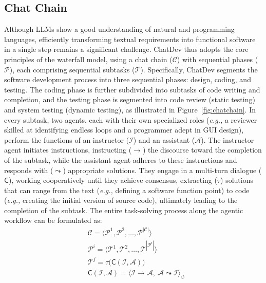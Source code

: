 \documentclass[11pt]{article}
\newcommand{\eg}{\textit{e.g., }}
\begin{document}
\subsection{Chat Chain}
Although LLMs show a good understanding of natural and programming languages, efficiently transforming textual requirements into functional software in a single step remains a significant challenge.
ChatDev thus adopts the core principles of the waterfall model, using a chat chain ($\mathcal{C}$) with sequential phases ($\mathcal{P}$), each comprising sequential subtasks ($\mathcal{T}$). Specifically, ChatDev segments the software development process into three sequential phases: design, coding, and testing.
The coding phase is further subdivided into subtasks of code writing and completion, and the testing phase is segmented into code review (static testing) and system testing (dynamic testing), as illustrated in Figure~\ref{fig:chatchain}.
In every subtask, two agents, each with their own specialized roles (\eg a reviewer skilled at identifying endless loops and a programmer adept in GUI design), perform the functions of an instructor ($\mathcal{I}$) and an assistant ($\mathcal{A}$).
The instructor agent initiates instructions, instructing ($\rightarrow$) the discourse toward the completion of the subtask, while the assistant agent adheres to these instructions and responds with ($\leadsto$) appropriate solutions.
They engage in a multi-turn dialogue ($\mathsf{C}$), working cooperatively until they achieve consensus, extracting ($\tau$) solutions that can range from the text (\eg defining a software function point) to code (\eg creating the initial version of source code), ultimately leading to the completion of the subtask.
The entire task-solving process along the agentic workflow can be formulated as:
\begin{equation}
\begin{aligned}
& \mathcal{C} = \langle \mathcal{P}^{1}, \mathcal{P}^{2} ,\dots,\mathcal{P}^{|\mathcal{C}|} \rangle \\
& \mathcal{P}^i = \langle \mathcal{T}^1, \mathcal{T}^2,\dots, \mathcal{T}^{|\mathcal{P}^i|} \rangle \\
& \mathcal{T}^j = \tau \big( \mathsf{C}(\mathcal{I},\mathcal{A}) \big) \\
& \mathsf{C}(\mathcal{I},\mathcal{A}) = {\langle \mathcal{I}\rightarrow\mathcal{A}, \ \mathcal{A}\leadsto\mathcal{I} \rangle}_{\circlearrowleft} \\
\end{aligned}
\end{equation}
\end{document}
